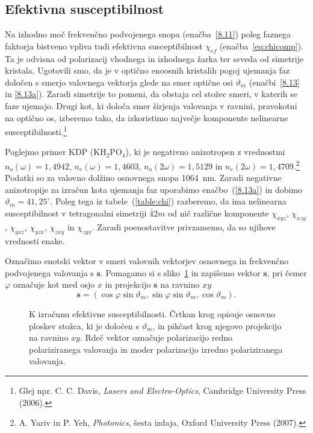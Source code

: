 \subsection*{Efektivna susceptibilnost}
Na izhodno moč frekvenčno podvojenega snopa (enačba~\ref{8.11}) 
poleg faznega faktorja bistveno vpliva tudi efektivna 
susceptibilnost $\chi_{ef}$ (enačba~\ref{eq:chicomp}). Ta je odvisna 
od polarizacij vhodnega in izhodnega žarka ter seveda od simetrije kristala. 
Ugotovili smo, da je v optično enoosnih kristalih pogoj ujemanja faz 
določen s smerjo valovnega vektorja glede na smer optične osi 
$\vartheta_m$ (enačbi~\ref{8.13} in \ref{8.13a}). Zaradi simetrije
to pomeni, da obstaja cel stožec smeri, v katerih se faze ujemajo.
Drugi kot, ki določa smer širjenja valovanja v ravnini, pravokotni na optično os, 
izberemo tako, da izkoristimo največje komponente nelinearne 
susceptibilnosti.\footnote{Glej npr. C. C. Davis, {\it Lasers and Electro-Optics}, 
Cambridge University Press (2006).}
\newpage

Poglejmo primer KDP (KH$_{2}$PO$_{4}$), ki je negativno anizotropen 
z vrednostmi $n_o(\omega) = 1,4942$, 
$n_e(\omega) = 1,4603$, $n_o(2\omega) = 1,5129$ in $n_e(2\omega) = 1,4709$.\footnote{A. Yariv in 
P. Yeh, {\it Photonics}, šesta izdaja, Oxford University Press (2007).}
Podatki so za valovno dolžino osnovnega snopa 1064~nm. 
Zaradi negativne anizotropije za izračun kota ujemanja faz 
uporabimo enačbo~(\ref{8.13a}) in dobimo $\vartheta_m = 41,25^\circ$. 
Poleg tega iz tabele~(\ref{table:chi}) razberemo, da ima nelinearna susceptibilnost v tetragonalni
simetriji $\bar{4}2m$ od nič različne komponente $\chi_{xyz}$, $\chi_{xzy}$, $\chi_{yxz}$,
$\chi_{yzx}$, $\chi_{zxy}$ in $\chi_{zyx}$.
Zaradi poenostavitve privzamemo, da so njihove vrednosti enake. 

Označimo enotski vektor v smeri valovnih vektorjev osnovnega in frekvenčno 
podvojenega valovanja s $\mathbf{s}$. Pomagamo si s sliko~\ref{fig:chi} in zapišemo 
vektor $\mathbf{s}$, pri čemer $\varphi$ označuje kot med osjo $x$ in projekcijo 
$\mathbf{s}$ na ravnino $xy$
\begin{equation}
\mathbf{s}=(\cos\varphi\sin\vartheta_m,\sin\varphi\sin\vartheta_m,\cos\vartheta_m).
\label{8.14}
\end{equation}

\begin{figure}[h]
\centering
\def\svgwidth{80truemm} 

\caption{K izračunu efektivne susceptibilnosti. Črtkan krog opisuje osnovno ploskev
stožca, ki je določen s $\vartheta_m$, in pikčast krog njegovo projekcijo
na ravnino $xy$. Rdeč vektor označuje polarizacijo redno polariziranega valovanja in
moder polarizacijo izredno polariziranega valovanja.}
\label{fig:chi}
\end{figure}


